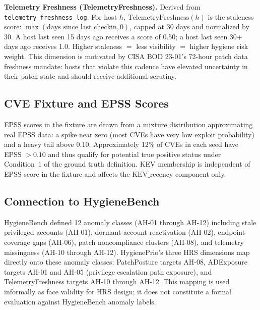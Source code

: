 \textbf{Telemetry Freshness (TelemetryFreshness).} Derived from \texttt{telemetry\_freshness\_log}. For host $h$, $\mathrm{TelemetryFreshness}(h)$ is the staleness score: $\max(\text{days\_since\_last\_checkin}, 0)$, capped at 30 days and normalized by 30. A host last seen 15 days ago receives a score of 0.50; a host last seen 30+ days ago receives 1.0. Higher staleness $=$ less visibility $=$ higher hygiene risk weight. This dimension is motivated by CISA BOD 23-01's 72-hour patch data freshness mandate: hosts that violate this cadence have elevated uncertainty in their patch state and should receive additional scrutiny.

\subsection{CVE Fixture and EPSS Scores}

EPSS scores in the fixture are drawn from a mixture distribution approximating real EPSS data: a spike near zero (most CVEs have very low exploit probability) and a heavy tail above 0.10. Approximately 12\% of CVEs in each seed have EPSS $> 0.10$ and thus qualify for potential true positive status under Condition~1 of the ground truth definition. KEV membership is independent of EPSS score in the fixture and affects the $\mathrm{KEV\_recency}$ component only.

\subsection{Connection to HygieneBench}

HygieneBench defined 12 anomaly classes (AH-01 through AH-12) including stale privileged accounts (AH-01), dormant account reactivation (AH-02), endpoint coverage gaps (AH-06), patch noncompliance clusters (AH-08), and telemetry missingness (AH-10 through AH-12). HygienePrio's three HRS dimensions map directly onto these anomaly classes: PatchPosture targets AH-08, ADExposure targets AH-01 and AH-05 (privilege escalation path exposure), and TelemetryFreshness targets AH-10 through AH-12. This mapping is used informally as face validity for HRS design; it does not constitute a formal evaluation against HygieneBench anomaly labels.
